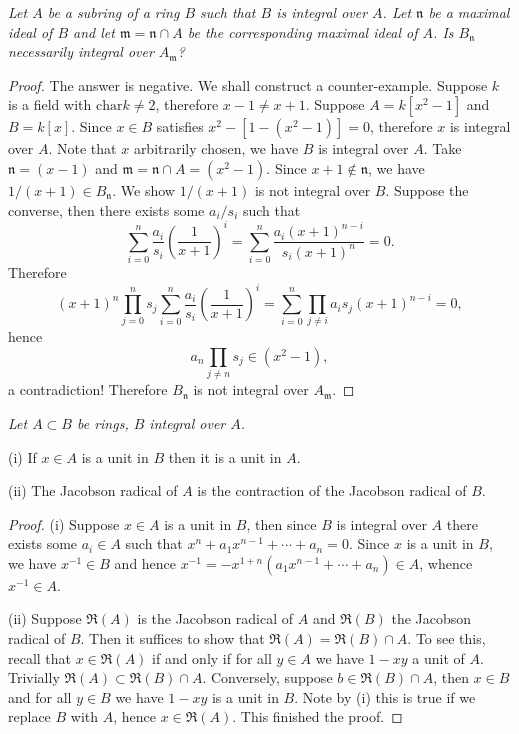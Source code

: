 \begin{problem}\em
Let $A$ be a subring of a ring $B$ such that $B$ is integral over $A$. Let $\mathfrak{n}$ be a maximal ideal of $B$ and let $\mathfrak{m}=\mathfrak{n}\cap A$ be the corresponding maximal ideal of $A$. Is $B_\mathfrak{n}$ necessarily integral over $A_\mathfrak{m}$?
\end{problem}
\begin{proof}
The answer is negative. We shall construct a counter-example. Suppose $k$ is a field with $\mathrm{char}k\ne 2$, therefore $x-1\ne x+1$. Suppose $A=k[x^2-1]$ and $B=k[x]$. Since $x\in B$ satisfies $x^2-[1-(x^2-1)]=0$, therefore $x$ is integral over $A$. Note that $x$ arbitrarily chosen, we have $B$ is integral over $A$. Take $\mathfrak{n}=(x-1)$ and $\mathfrak{m}=\mathfrak{n}\cap A=(x^2-1)$. Since $x+1\notin\mathfrak{n}$, we have $1/(x+1)\in B_\mathfrak{n}$. We show $1/(x+1)$ is not integral over $B$. Suppose the converse, then there exists some $a_i/s_i$ such that 
$$
\sum_{i=0}^n{\frac{a_i}{s_i}\left( \frac{1}{x+1} \right) ^i}=\sum_{i=0}^n{\frac{a_i\left( x+1 \right) ^{n-i}}{s_i\left( x+1 \right) ^n}}=0.
$$
Therefore 
$$
\left( x+1 \right) ^n\prod_{j=0}^n{s_j}\sum_{i=0}^n{\frac{a_i}{s_i}\left( \frac{1}{x+1} \right) ^i}=\sum_{i=0}^n{\prod_{j\ne i}{a_is_j\left( x+1 \right) ^{n-i}}}=0,
$$
hence 
$$
a_n\prod_{j\ne n}{s_j}\in \left( x^2-1 \right) ,
$$
a contradiction! Therefore $B_\mathfrak{n}$ is not integral over $A_\mathfrak{m}$.
\end{proof}
\begin{problem}\em
Let $A\subset B$ be rings, $B$ integral over $A$.\par
(i) If $x\in A$ is a unit in $B$ then it is a unit in $A$.\par
(ii) The Jacobson radical of $A$ is the contraction of the Jacobson radical of $B$.
\end{problem}
\begin{proof}
(i) Suppose $x\in A$ is a unit in $B$, then since $B$ is integral over $A$ there exists some $a_i\in A$ such that $x^n+a_1x^{n-1}+\cdots+a_n=0$. Since $x$ is a unit in $B$, we have $x^{-1}\in B$ and hence $x^{-1}=-x^{1+n}(a_1x^{n-1}+\cdots+a_n)\in A$, whence $x^{-1}\in A$.\par
(ii) Suppose $\mathfrak{R}(A)$ is the Jacobson radical of $A$ and $\mathfrak{R}(B)$ the Jacobson radical of $B$. Then it suffices to show that $\mathfrak{R}(A)=\mathfrak{R}(B)\cap A$. To see this, recall that $x\in\mathfrak{R}(A)$ if and only if for all $y\in A$ we have $1-xy$ a unit of $A$. Trivially $\mathfrak{R}(A)\subset\mathfrak{R}(B)\cap A$. Conversely, suppose $b\in\mathfrak{R}(B)\cap A$, then $x\in B$ and for all $y\in B$ we have $1-xy$ is a unit in $B$. Note by (i) this is true if we replace $B$ with $A$, hence $x\in\mathfrak{R}(A)$. This finished the proof.
\end{proof}
